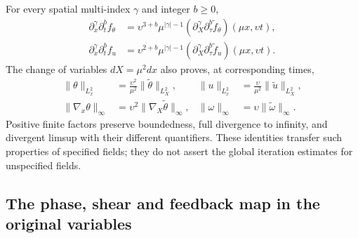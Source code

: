 For every spatial multi-index $\gamma$ and integer $b\geq0$,
\begin{align}\label{eq:wba-force-jets}
 \partial_x^\gamma\partial_t^bf_\theta
 &=\upsilon^{3+b}\mu^{|\gamma|-1}
 (\partial_X^\gamma\partial_\tau^b\widetilde f_\theta)(\mu x,\upsilon t),\\
 \partial_x^\gamma\partial_t^bf_u
 &=\upsilon^{2+b}\mu^{|\gamma|-1}
 (\partial_X^\gamma\partial_\tau^b\widetilde f_u)(\mu x,\upsilon t).
\end{align}
The change of variables $dX=\mu^2dx$ also proves, at corresponding times,
\begin{align}
 \|\theta\|_{L^2_x}&=\frac{\upsilon^2}{\mu^2}
 \|\widetilde\theta\|_{L^2_X},&
 \|u\|_{L^2_x}&=\frac{\upsilon}{\mu^2}
 \|\widetilde u\|_{L^2_X},\\
 \|\nabla_x\theta\|_\infty&=\upsilon^2
 \|\nabla_X\widetilde\theta\|_\infty,&
 \|\omega\|_\infty&=\upsilon\|\widetilde\omega\|_\infty.
\end{align}
Positive finite factors preserve boundedness, full divergence to infinity,
and divergent limsup with their different quantifiers. These identities
transfer such properties of specified fields; they do not assert the
global iteration estimates for unspecified fields.

\subsection{The phase, shear and feedback map in the original variables}

